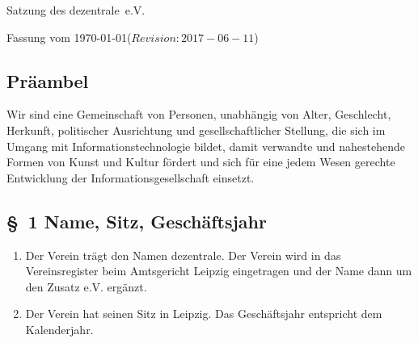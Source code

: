\documentclass[10pt,a4paper]{scrartcl}
\newcommand{\qs}[1]{\glqq#1\grqq}
\newcommand{\name}{dezentrale}
\newcommand{\revision}{$Revision: 2017-06-11 $}
\begin{document}
{\LARGE Satzung des \name\ e.V.}

Fassung vom \today (\revision)

\subsection*{Pr{\"a}ambel}



Wir sind eine Gemeinschaft von Personen, unabh{\"a}ngig von Alter,
Geschlecht, Herkunft, politischer Ausrichtung und gesellschaftlicher
Stellung, die sich im Umgang mit Informationstechnologie bildet, damit
verwandte und nahestehende Formen von Kunst und Kultur f{\"o}rdert und sich f{\"u}r
eine jedem Wesen gerechte Entwicklung der Informationsgesellschaft
einsetzt.
%
%
\subsection*{\S \ 1 Name, Sitz, Gesch{\"a}ftsjahr}
\begin{enumerate}
\item Der Verein tr{\"a}gt den Namen \qs{\name}. Der Verein wird in das
Vereinsregister beim Amtsgericht Leipzig eingetragen
und der Name dann um den Zusatz \qs{e.V.} erg{\"a}nzt.
\item Der Verein hat seinen Sitz in Leipzig. Das Gesch{\"a}ftsjahr entspricht
dem Kalenderjahr.
\end{enumerate}
%
%
\end{document}
